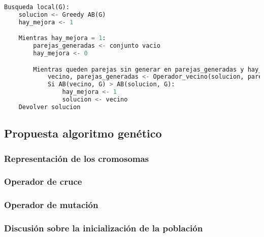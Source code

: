 \begin{lstlisting}[language=python]
Busqueda local(G):
	solucion <- Greedy AB(G)
	hay_mejora <- 1

	Mientras hay_mejora = 1:
		parejas_generadas <- conjunto vacio
		hay_mejora <- 0

		Mientras queden parejas sin generar en parejas_generadas y hay_mejora = 0:
			vecino, parejas_generadas <- Operador_vecino(solucion, parejas_generadas)
			Si AB(vecino, G) > AB(solucion, G):
				hay_mejora <- 1
				solucion <- vecino
	Devolver solucion
\end{lstlisting}

\subsection{Propuesta algoritmo genético}

\subsubsection{Representación de los cromosomas}

\subsubsection{Operador de cruce}

\subsubsection{Operador de mutación}

\subsubsection{Discusión sobre la inicialización de la población}

